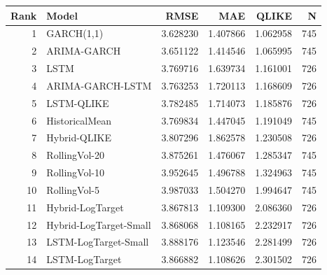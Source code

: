 \begin{tabular}{r l r r r r}
\hline
Rank & Model & RMSE & MAE & QLIKE & N \\
\hline
1 & GARCH(1,1) & 3.628230 & 1.407866 & 1.062958 & 745 \\
2 & ARIMA-GARCH & 3.651122 & 1.414546 & 1.065995 & 745 \\
3 & LSTM & 3.769716 & 1.639734 & 1.161001 & 726 \\
4 & ARIMA-GARCH-LSTM & 3.763253 & 1.720113 & 1.168609 & 726 \\
5 & LSTM-QLIKE & 3.782485 & 1.714073 & 1.185876 & 726 \\
6 & HistoricalMean & 3.769834 & 1.447045 & 1.191049 & 745 \\
7 & Hybrid-QLIKE & 3.807296 & 1.862578 & 1.230508 & 726 \\
8 & RollingVol-20 & 3.875261 & 1.476067 & 1.285347 & 745 \\
9 & RollingVol-10 & 3.952645 & 1.496788 & 1.324963 & 745 \\
10 & RollingVol-5 & 3.987033 & 1.504270 & 1.994647 & 745 \\
11 & Hybrid-LogTarget & 3.867813 & 1.109300 & 2.086360 & 726 \\
12 & Hybrid-LogTarget-Small & 3.868068 & 1.108165 & 2.232917 & 726 \\
13 & LSTM-LogTarget-Small & 3.888176 & 1.123546 & 2.281499 & 726 \\
14 & LSTM-LogTarget & 3.866882 & 1.108626 & 2.301502 & 726 \\
\hline
\end{tabular}
